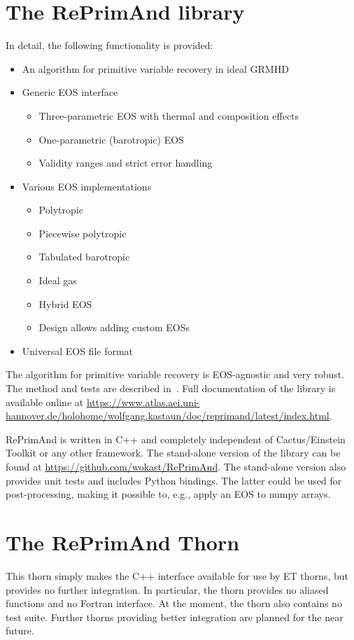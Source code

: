 \section{The RePrimAnd library}
In detail, the following functionality is provided: 
\begin{itemize}
\item An algorithm for primitive variable recovery in ideal GRMHD
\item Generic EOS interface
\begin{itemize}
\item Three-parametric EOS with thermal and composition effects
\item One-parametric (barotropic) EOS
\item Validity ranges and strict error handling
\end{itemize}
\item Various EOS implementations
\begin{itemize}
\item Polytropic
\item Piecewise polytropic
\item Tabulated barotropic
\item Ideal gas
\item Hybrid EOS
\item Design allows adding custom EOSs 
\end{itemize}
\item Universal EOS file format 
\end{itemize}


The algorithm for primitive variable recovery is EOS-agnostic and very robust. 
The method and tests are described in~\cite{RePrimaAnd_PhysRevD.103.023018}. 
Full documentation of the library is available online at
\url{https://www.atlas.aei.uni-hannover.de/holohome/wolfgang.kastaun/doc/reprimand/latest/index.html}.

RePrimAnd is written in C++ and completely independent of Cactus/Einstein Toolkit or any other 
framework. The stand-alone version of the library can be found at
\url{https://github.com/wokast/RePrimAnd}.
The stand-alone version also provides unit tests and includes Python bindings. The latter
could be used for post-processing, making it possible to, e.g., apply an EOS to numpy arrays. 

\section{The RePrimAnd Thorn}
This thorn simply makes the C++ interface available for use by ET thorns, but provides no further
integration. In particular, the thorn provides no aliased functions and no Fortran interface.
At the moment, the thorn also contains no test suite.
Further thorns providing better integration are planned for the near future.

